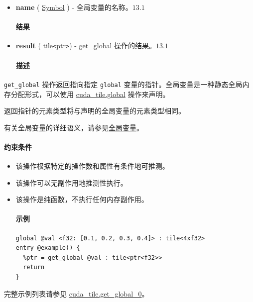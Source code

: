 \documentclass{article}
\begin{document}
\begin{itemize}
\item \textbf{name} ( \href{https://docs.nvidia.com/cuda/tile-ir/latest/sections/operations.html#type-symbol}{Symbol} ) - 全局变量的名称。$\boxed{13.1}$


\paragraph{结果}

\item \textbf{result} ( \href{https://docs.nvidia.com/cuda/tile-ir/latest/sections/types.html#type-tile}{tile}\texttt{<}\href{https://docs.nvidia.com/cuda/tile-ir/latest/sections/types.html#type-ptr}{ptr}\texttt{>}) - get\_global 操作的结果。$\boxed{13.1}$


\paragraph{描述}

\end{itemize}
\texttt{get\_global} 操作返回指向指定 \texttt{global} 变量的指针。全局变量是一种静态全局内存分配形式，可以使用 \href{https://docs.nvidia.com/cuda/tile-ir/latest/sections/operations.html#op-cuda-tile-global}{cuda\_tile.global} 操作来声明。


返回指针的元素类型将与声明的全局变量的元素类型相同。


有关全局变量的详细语义，请参见\href{https://docs.nvidia.com/cuda/tile-ir/latest/sections/semantics.html#sub-sec-tile-global}{全局变量}。



\paragraph{约束条件}

\begin{itemize}
\item 该操作根据特定的操作数和属性有条件地可推测。
\item 该操作可以无副作用地推测性执行。
\item 该操作是纯函数，不执行任何内存副作用。


\paragraph{示例}

\begin{lstlisting}
global @val <f32: [0.1, 0.2, 0.3, 0.4]> : tile<4xf32>
entry @example() {
  %ptr = get_global @val : tile<ptr<f32>>
  return
}
\end{lstlisting}

\end{itemize}
完整示例列表请参见 \href{https://docs.nvidia.com/cuda/tile-ir/latest/sections/appendix.html#example-cuda-tile-get-global-0}{cuda\_tile.get\_global\_0}。
\end{document}
